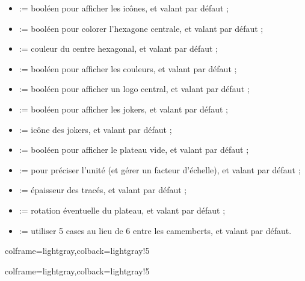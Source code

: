\documentclass[11pt,a4paper]{ltxdoc}
\begin{document}
\begin{itemize}
	\hfill{} par défaut ;
	\item {} := booléen pour afficher les icônes, et valant  par défaut ;
	\item {} := booléen pour colorer l'hexagone centrale, et valant  par défaut ;
	\item {} := couleur du centre hexagonal, et valant  par défaut ;
	\item {} := booléen pour afficher les couleurs, et valant  par défaut ;
	\item {} := booléen pour afficher un logo central, et valant  par défaut ;
	\item {} := booléen pour afficher les jokers, et valant  par défaut ;
	\item {} := icône des jokers, et valant  par défaut ;%
	\item {} := booléen pour afficher le plateau vide, et valant  par défaut ;
	\item {} := pour préciser l'unité (et gérer un facteur d'échelle), et valant  par défaut ;
	\item {} := épaisseur des tracés, et valant \MontreCode{0.8pt} par défaut ;
	\item {} := rotation éventuelle du plateau, et valant  par défaut ;
	\item {} := utiliser 5 cases au lieu de 6 entre les camemberts, et valant  par défaut.
\end{itemize}

\begin{tcblisting}{colframe=lightgray,colback=lightgray!5}
\PlateauTrivialPursuit[Rotation=35,Unite=0.5]
\PlateauTrivialPursuit[Unite=0.5]
\end{tcblisting}

\begin{tcblisting}{colframe=lightgray,colback=lightgray!5}
\PlateauTrivialPursuit[Unite=0.5,Icones=false]
\PlateauTrivialPursuit[Unite=0.5,Couleurs=false]
\end{tcblisting}
\end{document}
